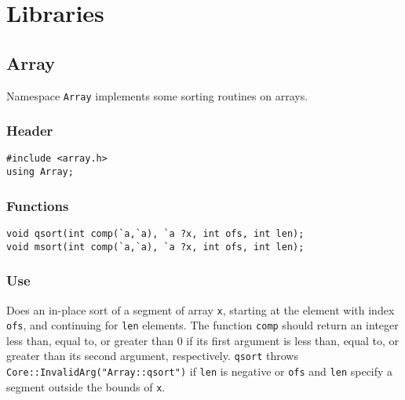 \section{Libraries}
\newcommand{\code}[1]{\texttt{#1}}
\newcommand{\var}[1]{\texttt{#1}}
\newcommand{\defunlabel}[1]{%
  \parbox[b]{\labelwidth}{\makebox[0pt][l]{#1}\\}}
\newenvironment{defun}[2]{%
  \begin{list}{}{}%
    \renewcommand{\makelabel}{\defunlabel}%
    \index{#1@\texttt{#1}}%
  \item[\textbf{\texttt{#1}}\texttt{#2}]}{\end{list}}
\newcommand{\tindex}[1]{}
\newcommand{\exindex}[1]{}

\subsection{Array}

Namespace \code{Array} implements some sorting routines on arrays.

\subsubsection*{Header}
\begin{verbatim}
#include <array.h>
using Array;
\end{verbatim}

\subsubsection*{Functions}
\begin{verbatim}
void qsort(int comp(`a,`a), `a ?x, int ofs, int len);
void msort(int comp(`a,`a), `a ?x, int ofs, int len);
\end{verbatim}

\subsubsection*{Use}

\begin{defun}{qsort}{(comp,x,ofs,len)}
  Does an in-place sort of a segment of array \var{x}, starting at the
  element with index \var{ofs}, and continuing for \var{len} elements.
  The function \var{comp} should return an integer less than, equal
  to, or greater than 0 if its first argument is less than, equal to,
  or greater than its second argument, respectively.  \code{qsort}
  throws \code{Core::InvalidArg("Array::qsort")} if \var{len} is
  negative or \var{ofs} and \var{len} specify a segment outside the
  bounds of \var{x}.
\end{defun}


